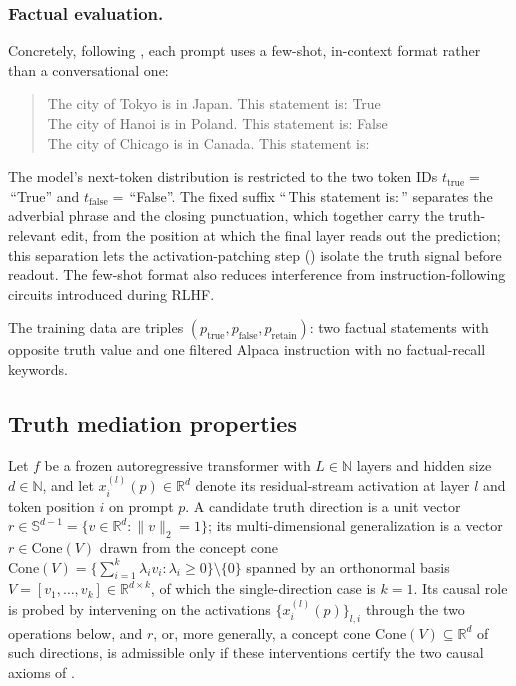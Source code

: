 \documentclass[sn-basic]{sn-jnl}
\begin{document}
\subsubsection*{Factual evaluation.}
Concretely, following \citet{marksGeometryTruthEmergent2024}, each prompt uses a
few-shot, in-context format rather than a conversational one:

\begin{quote}\ttfamily\small The city of Tokyo is in Japan. This statement is:
True\\
The city of Hanoi is in Poland. This statement is: False\\
The city of Chicago is in Canada. This statement is:
\end{quote}
%
\noindent The model's next-token distribution is restricted to the two token IDs
$t_{\text{true}}=$\,``True'' and $t_{\text{false}}=$\,``False''. The fixed
suffix ``\,This statement is:\,'' separates the adverbial phrase and the closing
punctuation, which together carry the truth-relevant edit, from the position at
which the final layer reads out the prediction; this separation lets the
activation-patching step () isolate the truth signal before
readout. The few-shot format also reduces interference from
instruction-following circuits introduced during RLHF.

The training data are triples $(p_{\text{true}}, p_{\text{false}},
p_{\text{retain}})$: two factual statements with opposite truth value and one
filtered Alpaca instruction with no factual-recall keywords.


\subsection{Truth mediation properties}
\label{sec:axioms}

Let $f$ be a frozen autoregressive transformer with $L \in \mathbb{N}$ layers
and hidden size $d \in \mathbb{N}$, and let $x^{(l)}_{i}(p) \in \mathbb{R}^{d}$
denote its residual-stream activation at layer $l$ and token position $i$ on
prompt $p$. A candidate truth direction is a unit vector $r \in \mathbb{S}^{d-1}
= \{v \in \mathbb{R}^{d} : \|v\|_2 = 1\}$; its multi-dimensional generalization
is a vector $r \in \mathrm{Cone}(V)$ drawn from the concept cone
$\mathrm{Cone}(V) = \{\sum_{i=1}^{k} \lambda_i v_i : \lambda_i \ge 0\} \setminus
\{0\}$ spanned by an orthonormal basis $V = [v_1, \ldots, v_k] \in \mathbb{R}^{d
\times k}$, of which the single-direction case is $k=1$. Its causal role is
probed by intervening on the activations $\{x^{(l)}_{i}(p)\}_{l,i}$ through the
two operations below, and $r$, or, more generally, a concept cone
$\mathrm{Cone}(V) \subseteq \mathbb{R}^{d}$ of such directions, is admissible
only if these interventions certify the two causal axioms of .
\end{document}
